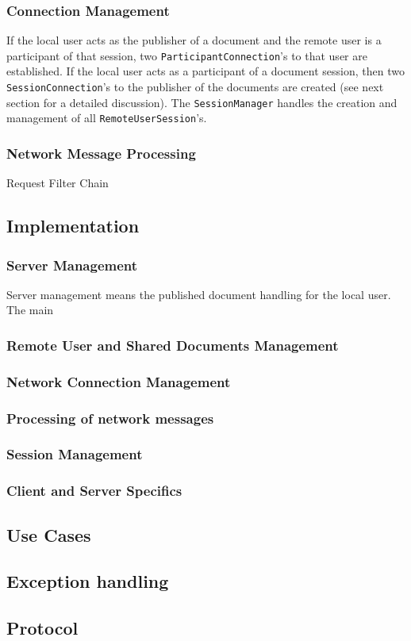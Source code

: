 \subsubsection{Connection Management}


If the local user acts as the publisher of a document and the remote user is a participant of that session, two \texttt{ParticipantConnection}'s to that user are established. If the local user acts as a participant of a document session, then two \texttt{SessionConnection}'s to the publisher of the documents are created (see next section for a detailed discussion). The \texttt{Session\-Manager} handles the creation and management of all \texttt{RemoteUserSession}'s. 


\subsubsection{Network Message Processing}

Request Filter Chain





\subsection{Implementation}
 \label{network.communication.implementation}


\subsubsection{Server Management}
Server management means the published document handling for the local user. The main 


\subsubsection{Remote User and Shared Documents Management}

\subsubsection{Network Connection Management}

\subsubsection{Processing of network messages}

\subsubsection{Session Management}

\subsubsection{Client and Server Specifics}


\subsection{Use Cases}



\subsection{Exception handling}

\subsection{Protocol}
